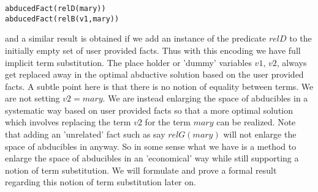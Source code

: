 \documentclass{article}
\begin{document}
\begin{verbatim}
abducedFact(relD(mary)) 
abducedFact(relB(v1,mary))
\end{verbatim} and a similar result is obtained if we add an instance of the predicate $relD$ to the initially empty set of user provided facts. Thus with this encoding we have full implicit term substitution. The place holder or 'dummy' variables $v1$, $v2$, always get replaced away in the optimal abductive solution based on the user provided facts. A subtle point here is that there is no notion of equality between terms. We are not setting $v2 = mary$. We are instead enlarging the space of abducibles in a systematic way based on user provided facts so that a more optimal solution which involves replacing the term $v2$ for the term $mary$ can be realized. Note that adding an 'unrelated' fact such as say $relG(mary)$ will not enlarge the space of abducibles in anyway. So in some sense what we have is a method to enlarge the space of abducibles in an 'economical' way while still supporting a notion of term substitution. We will formulate and prove a formal result regarding this notion of term substitution later on. 
\end{document}
